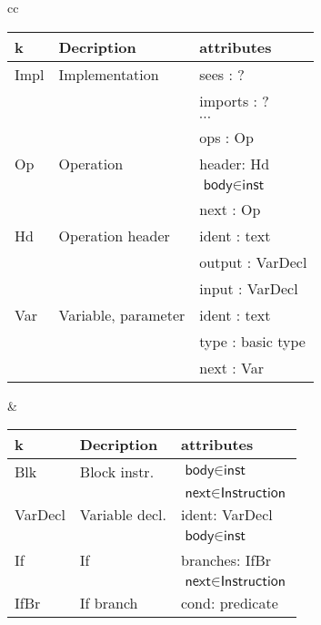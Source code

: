 \documentclass{article}
\begin{document}
\begin{table}
  \begin{center}
    \begin{tabular}[t]{cc}
      \begin{tabular}[t]{|l|l|l|}
        \hline
        \textsf{k} & Decription & attributes\\
        \hline
        \hline
        \textsf{Impl} & Implementation & \textsf{sees} : ? \\
        & & \textsf{imports} : ? \\
        & & $\cdots$ \\
        & & \textsf{ops} : Op \\
        \hline
        \textsf{Op} & Operation & \textsf{header}: \textsf{Hd} \\
        & & $\textsf{body} \in \textsf{inst}$ \\
        & & \textsf{next} : \textsf{Op} \\
        \hline
        \textsf{Hd} & Operation header & \textsf{ident} : text \\
        & & \textsf{output} : \textsf{VarDecl} \\
        & & \textsf{input} : \textsf{VarDecl} \\
        \hline
        \textsf{Var} & Variable, parameter & \textsf{ident} : text \\
        & & \textsf{type} : basic type \\
        & & \textsf{next} : \textsf{Var} \\
        \hline
      \end{tabular}
      &
      \begin{tabular}[t]{|l|l|l|}
        \hline
        \textsf{k} & Decription & attributes\\
        \hline
        \hline
        \textsf{Blk} & Block instr. & $\textsf{body} \in \textsf{inst}$ \\
        & & $\textsf{next} \in \textsf{Instruction}$ \\
        \hline
        \textsf{VarDecl} & Variable decl. & \textsf{ident}: \textsf{VarDecl} \\
        & & $\textsf{body} \in \textsf{inst}$ \\
        \hline
        \textsf{If} & If & \textsf{branches}: \textsf{IfBr} \\
        & & $\textsf{next} \in \textsf{Instruction}$ \\
        \hline
        \textsf{IfBr} & If branch & \textsf{cond}: predicate \\

\end{tabular}
\end{tabular}
\end{center}
\end{table}
\end{document}
